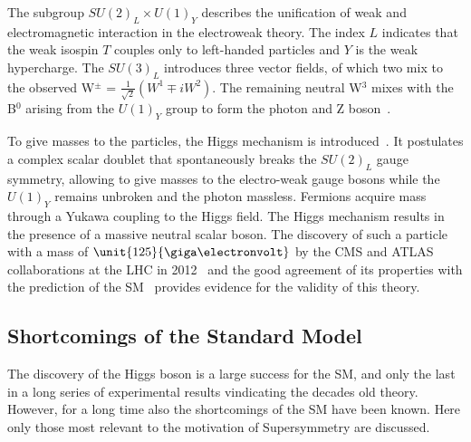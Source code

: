 The subgroup $SU(2)_L \times U(1)_Y$ describes the unification of weak and electromagnetic interaction in the electroweak theory. The index $L$ indicates that the weak isospin $T$ couples only to left-handed particles and $Y$ is the weak hypercharge. The $SU(3)_L$ introduces three vector fields, of which two mix to the observed W$^{\pm}$ = $\frac{1}{\sqrt{2}}(W^1\mp iW^2)$. The remaining neutral W$^3$ mixes with the B$^0$ arising from the $U(1)_Y$ group to form the photon and Z boson~\cite{HalzenMartin}.

To give masses to the particles, the Higgs mechanism is introduced~\cite{PhysRevLett.13.508,PhysRevLett.13.321,PhysRevLett.13.585}. It postulates a complex scalar doublet that spontaneously breaks the $SU(2)_L$ gauge symmetry, allowing to give masses to the electro-weak gauge bosons while the $U(1)_Y$ remains unbroken and the photon massless. Fermions acquire mass through a Yukawa coupling to the Higgs field. The Higgs mechanism results in the presence of a massive neutral scalar boson. The discovery of such a particle with a mass of $\unit{125}{\giga\electronvolt}$ by the CMS and ATLAS collaborations at the LHC in 2012~\cite{Chatrchyan:2012ufa,Aad:2012tfa} and the good agreement of its properties with the prediction of the SM~\cite{Khachatryan:2014jba} provides evidence for the validity of this theory.   

\subsection*{Shortcomings of the Standard Model}
The discovery of the Higgs boson is a large success for the SM, and only the last in a long series of experimental results vindicating the decades old theory. However, for a long time also the shortcomings of the SM have been known. Here only those most relevant to the motivation of Supersymmetry are discussed.

